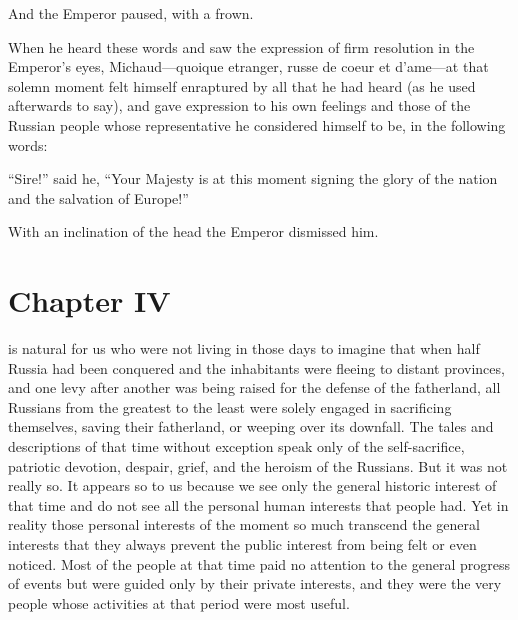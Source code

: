 And the Emperor paused, with a frown.

When he heard these words and saw the expression of firm
resolution in the Emperor's eyes, Michaud---quoique etranger,
russe de coeur et d'ame---at that solemn moment felt himself
enraptured by all that he had heard (as he used afterwards to
say), and gave expression to his own feelings and those of the
Russian people whose representative he considered himself to be,
in the following words:

``Sire!'' said he, ``Your Majesty is at this moment signing the
glory of the nation and the salvation of Europe!''

With an inclination of the head the Emperor dismissed him.


\chapter*{Chapter IV} \ifaudio {}
\fi

 is natural for us who were not living in those days to imagine
that when half Russia had been conquered and the inhabitants were
fleeing to distant provinces, and one levy after another was
being raised for the defense of the fatherland, all Russians from
the greatest to the least were solely engaged in sacrificing
themselves, saving their fatherland, or weeping over its
downfall. The tales and descriptions of that time without
exception speak only of the self-sacrifice, patriotic devotion,
despair, grief, and the heroism of the Russians. But it was not
really so. It appears so to us because we see only the general
historic interest of that time and do not see all the personal
human interests that people had. Yet in reality those personal
interests of the moment so much transcend the general interests
that they always prevent the public interest from being felt or
even noticed. Most of the people at that time paid no attention
to the general progress of events but were guided only by their
private interests, and they were the very people whose activities
at that period were most useful.


